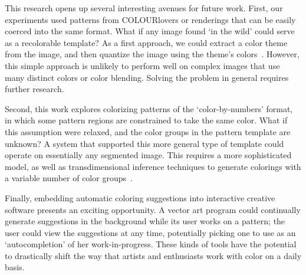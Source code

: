 

This research opens up several interesting avenues for future work.
First, our experiments used patterns from COLOURlovers or renderings that can be easily coerced into the same format. What if any image found `in the wild' could serve as a recolorable template? As a first approach, we could extract a color theme from the image, and then quantize the image using the theme's colors~\cite{SharonPaletteExtraction}. However, this simple approach is unlikely to perform well on complex images that use many distinct colors or color blending. Solving the problem in general requires further research.

Second, this work explores colorizing patterns of the `color-by-numbers' format, in which some pattern regions are constrained to take the same color. What if this assumption were relaxed, and the color groups in the pattern template are unknown? A system that supported this more general type of template could operate on essentially any segmented image. This requires a more sophisticated model, as well as transdimensional inference techniques to generate colorings with a variable number of color groups~\cite{YiTingLARJ}.

Finally, embedding automatic coloring suggestions into interactive creative software presents an exciting opportunity. A vector art program could continually generate suggestions in the background while its user works on a pattern; the user could view the suggestions at any time, potentially picking one to use as an `autocompletion' of her work-in-progress. These kinds of tools have the potential to drastically shift the way that artists and enthusiasts work with color on a daily basis. 